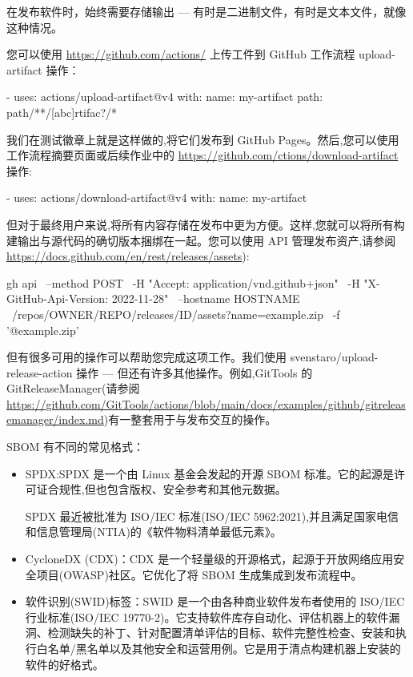 
在发布软件时，始终需要存储输出 --- 有时是二进制文件，有时是文本文件，就像这种情况。

您可以使用 \url{https://github.com/actions/} 上传工件到 GitHub 工作流程 upload-artifact 操作：

\begin{shell}
- uses: actions/upload-artifact@v4
  with:
    name: my-artifact
    path: path/**/[abc]rtifac?/*
\end{shell}

我们在测试徽章上就是这样做的,将它们发布到 GitHub Pages。然后,您可以使用工作流程摘要页面或后续作业中的 \url{https://github.com/ctions/download-artifact} 操作:

\begin{shell}
- uses: actions/download-artifact@v4
  with:
    name: my-artifact
\end{shell}

但对于最终用户来说,将所有内容存储在发布中更为方便。这样,您就可以将所有构建输出与源代码的确切版本捆绑在一起。您可以使用 API 管理发布资产,请参阅 \url{https://docs.github.com/en/rest/releases/assets}):

\begin{shell}
gh api \
  --method POST \
  -H "Accept: application/vnd.github+json" \
  -H "X-GitHub-Api-Version: 2022-11-28" \
  --hostname HOSTNAME \
  /repos/OWNER/REPO/releases/ID/assets?name=example.zip \
  -f '@example.zip'
\end{shell}

但有很多可用的操作可以帮助您完成这项工作。我们使用 svenstaro/upload-release-action 操作 --- 但还有许多其他操作。例如,GitTools 的 GitReleaseManager(请参阅 \url{https://github.com/GitTools/actions/blob/main/docs/examples/github/gitreleasemanager/index.md})有一整套用于与发布交互的操作。

\mySubsubsection{6.8.4}{There’s more…}

SBOM 有不同的常见格式：

\begin{itemize}
\item 
SPDX:SPDX 是一个由 Linux 基金会发起的开源 SBOM 标准。它的起源是许可证合规性,但也包含版权、安全参考和其他元数据。

SPDX 最近被批准为 ISO/IEC 标准(ISO/IEC 5962:2021),并且满足国家电信和信息管理局(NTIA)的《软件物料清单最低元素》。

\item 
CycloneDX (CDX)：CDX 是一个轻量级的开源格式，起源于开放网络应用安全项目(OWASP)社区。它优化了将 SBOM 生成集成到发布流程中。

\item 
软件识别(SWID)标签：SWID 是一个由各种商业软件发布者使用的 ISO/IEC 行业标准(ISO/IEC 19770-2)。它支持软件库存自动化、评估机器上的软件漏洞、检测缺失的补丁、针对配置清单评估的目标、软件完整性检查、安装和执行白名单/黑名单以及其他安全和运营用例。它是用于清点构建机器上安装的软件的好格式。
\end{itemize}

